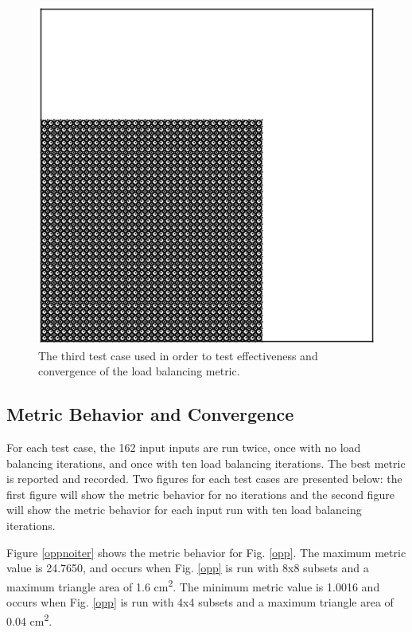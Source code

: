 \documentclass{anstrans}
\begin{document}
\begin{figure}[H]
\centering
\includegraphics[scale = 0.5]{figures/lattice-12-shifted.eps}
\caption{The third test case used in order to test effectiveness and convergence of the load balancing metric.}
\label{lattice}
\end{figure}

\subsection{Metric Behavior and Convergence}

For each test case, the 162 input inputs are run twice, once with no load balancing iterations, and once with ten load balancing iterations. The best metric is reported and recorded. Two figures for each test cases are presented below: the first figure will show the metric behavior for no iterations and the second figure will show the metric behavior for each input run with ten load balancing iterations.

Figure \ref{oppnoiter} shows the metric behavior for Fig. \ref{opp}. The maximum metric value is 24.7650, and occurs when Fig. \ref{opp} is run with 8x8 subsets and a maximum triangle area of 1.6 cm\textsuperscript{2}. The minimum metric value is 1.0016 and occurs when Fig. \ref{opp} is run with 4x4 subsets and a maximum triangle area of 0.04 cm\textsuperscript{2}. 
\end{document}
